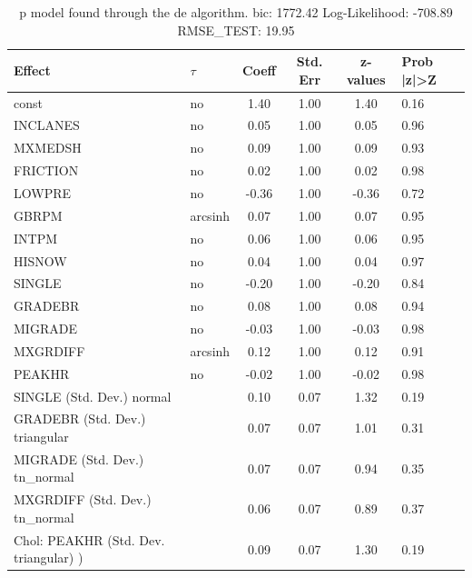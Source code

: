 \begin{table}
	\caption{p model found through the de algorithm. bic: 1772.42 Log-Likelihood: -708.89 RMSE_TEST: 19.95}
	\begin{center}
		\begin{tabular}{|l|l|c|c|c|l|}
			\hline
			Effect & $\tau$ & Coeff & Std. Err & z-values & Prob |z|>Z \\
			\hline
			const & no & 1.40 & 1.00 & 1.40 & 0.16 \\
			\hline
			INCLANES & no & 0.05 & 1.00 & 0.05 & 0.96 \\
			\hline
			MXMEDSH & no & 0.09 & 1.00 & 0.09 & 0.93 \\
			\hline
			FRICTION & no & 0.02 & 1.00 & 0.02 & 0.98 \\
			\hline
			LOWPRE & no & -0.36 & 1.00 & -0.36 & 0.72 \\
			\hline
			GBRPM & arcsinh & 0.07 & 1.00 & 0.07 & 0.95 \\
			\hline
			INTPM & no & 0.06 & 1.00 & 0.06 & 0.95 \\
			\hline
			HISNOW & no & 0.04 & 1.00 & 0.04 & 0.97 \\
			\hline
			SINGLE & no & -0.20 & 1.00 & -0.20 & 0.84 \\
			\hline
			GRADEBR & no & 0.08 & 1.00 & 0.08 & 0.94 \\
			\hline
			MIGRADE & no & -0.03 & 1.00 & -0.03 & 0.98 \\
			\hline
			MXGRDIFF & arcsinh & 0.12 & 1.00 & 0.12 & 0.91 \\
			\hline
			PEAKHR & no & -0.02 & 1.00 & -0.02 & 0.98 \\
			\hline
			SINGLE (Std. Dev.) normal &  & 0.10 & 0.07 & 1.32 & 0.19 \\
			\hline
			GRADEBR (Std. Dev.) triangular &  & 0.07 & 0.07 & 1.01 & 0.31 \\
			\hline
			MIGRADE (Std. Dev.) tn_normal &  & 0.07 & 0.07 & 0.94 & 0.35 \\
			\hline
			MXGRDIFF (Std. Dev.) tn_normal &  & 0.06 & 0.07 & 0.89 & 0.37 \\
			\hline
			 Chol: PEAKHR (Std. Dev. triangular) ) &  & 0.09 & 0.07 & 1.30 & 0.19 \\
			\hline
		\end{tabular}
	\end{center}
\end{table}